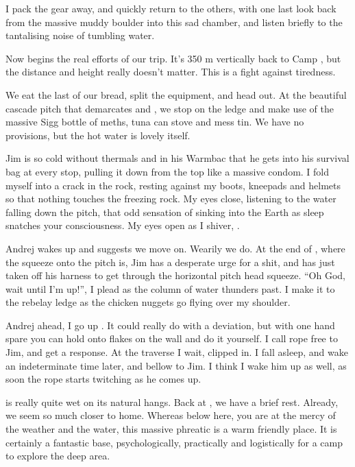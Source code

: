 I pack the gear away, and quickly return to the others, with one last
look back from the massive muddy boulder into this sad chamber, and
listen briefly to the tantalising noise of tumbling water.

Now begins the real efforts of our trip. It's 350 m vertically back to
Camp , but the distance and height really doesn't matter.
This is a fight against tiredness.

We eat the last of our bread, split the equipment, and head out. At the
beautiful cascade pitch that demarcates  and , we stop on
the ledge and make use of the massive Sigg bottle of meths, tuna can
stove and mess tin. We have no provisions, but the hot water is lovely
itself.

Jim is so cold without thermals and in his Warmbac that he gets into his
survival bag at every stop, pulling it down from the top like a massive
condom. I fold myself into a crack in the rock, resting against my
boots, kneepads and helmets so that nothing touches the freezing rock.
My eyes close, listening to the water falling down the pitch, that odd
sensation of sinking into the Earth as sleep snatches your
consciousness. My eyes open as I shiver, .

Andrej wakes up and suggests we move on. Wearily we do. At the end of
, where the squeeze onto the pitch is, Jim has a desperate urge for
a shit, and has just taken off his harness to get through the horizontal
pitch head squeeze. ``Oh God, wait until I'm up!'', I plead as the
column of water thunders past. I make it to the rebelay ledge as the
chicken nuggets go flying over my shoulder.

Andrej ahead, I go up . It could really do with a
deviation, but with one hand spare you can hold onto flakes on the wall
and do it yourself. I call rope free to Jim, and get a response. At the
traverse I wait, clipped in. I fall asleep, and wake an indeterminate
time later, and bellow to Jim. I think I wake him up as well, as soon
the rope starts twitching as he comes up.

 is really quite wet on its natural hangs. Back at , we have a brief rest. Already, we seem so much closer to home.
Whereas below here, you are at the mercy of the weather and the water,
this massive phreatic is a warm friendly place. It is certainly a
fantastic base, psychologically, practically and logistically for a camp
to explore the deep area.

